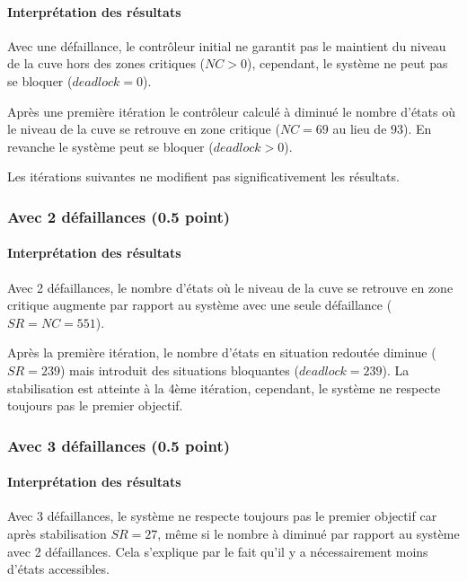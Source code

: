 \documentclass[a4paper]{book}
\begin{document}
\paragraph{Interprétation des résultats}

Avec une défaillance, le contrôleur initial ne garantit pas le maintient du
niveau de la cuve hors des zones critiques ($NC > 0$), cependant, le système ne
peut pas se bloquer ($deadlock = 0$).

Après une première itération le contrôleur calculé à diminué le nombre d'états
où le niveau de la cuve se retrouve en zone critique ($NC = 69$ au lieu de
$93$). En revanche le système peut se bloquer ($deadlock > 0$).

Les itérations suivantes ne modifient pas significativement les résultats.

\subsubsection{Avec 2 défaillances (0.5 point)}

\paragraph{Interprétation des résultats}

Avec 2 défaillances, le nombre d'états où le niveau de la cuve se retrouve en
zone critique augmente par rapport au système avec une seule défaillance ($SR = NC = 551$).

Après la première itération, le nombre d'états en situation redoutée diminue ($SR = 239$)
mais introduit des situations bloquantes ($deadlock = 239$).
La stabilisation est atteinte à la 4ème itération, cependant, le système ne respecte toujours
pas le premier objectif.

\subsubsection{Avec 3 défaillances (0.5 point)}

\paragraph{Interprétation des résultats}

Avec 3 défaillances, le système ne respecte toujours pas le premier objectif car après
stabilisation $SR = 27$, même si le nombre à diminué par rapport au système avec 2 défaillances.
Cela s'explique par le fait qu'il y a nécessairement moins d'états accessibles.
\end{document}

